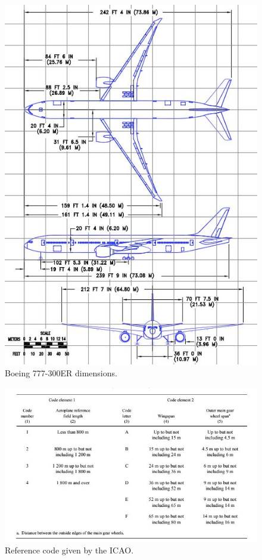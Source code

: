 			\begin{figure}[H]
				\centering
				\includegraphics[clip, trim=0cm 0cm 0cm 0cm, width=1\textwidth]{./images/B777/Dimensions777}
				\caption{Boeing 777-300ER dimensions.} %
				\label{} %
			\end{figure}
				
			\begin{figure}[H]
				\centering
				\includegraphics[clip, trim=0cm 0cm 0cm 0cm, width=1\textwidth]{./images/Annex14/Referencecode}
				\caption{Reference code given by the ICAO.} %
				\label{} %
			\end{figure}
		
